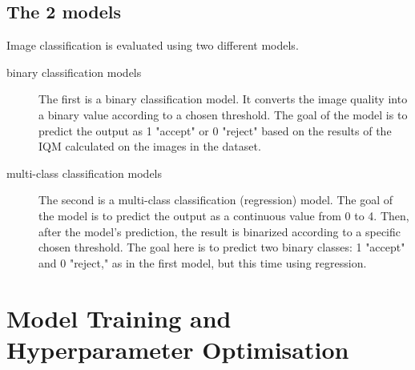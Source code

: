 \subsection{The 2 models}


Image classification is evaluated using two different models.
\begin{description}
    \item[binary classification models] The first is a binary classification model. It converts the image quality into a binary value according to a chosen threshold. The goal of the model is to predict the output as 1 "accept" or 0 "reject" based on the results of the IQM calculated on the images in the dataset.
    \item[multi-class classification models] The second is a multi-class classification (regression) model. The goal of the model is to predict the output as a continuous value from 0 to 4. Then, after the model's prediction, the result is binarized according to a specific chosen threshold. The goal here is to predict two binary classes: 1 "accept" and 0 "reject," as in the first model, but this time using regression.
\end{description}


\section{Model Training and Hyperparameter Optimisation}
\label{sec:model_training_optimisation}

